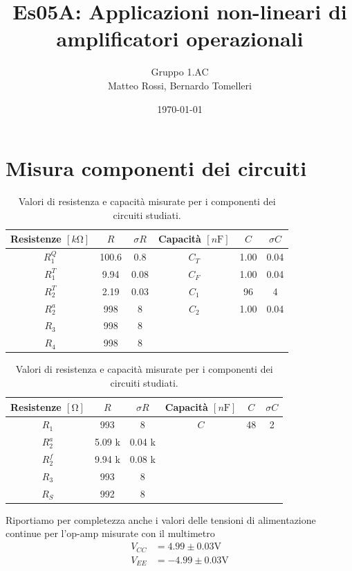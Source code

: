 \documentclass[10pt,a4paper]{article}
\author{Gruppo 1.AC \\ Matteo Rossi, Bernardo Tomelleri}
\title{Es05A: Applicazioni non-lineari di amplificatori operazionali}
\begin{document}
\date{\today}
\maketitle

\setcounter{section}{0}

\section*{Misura componenti dei circuiti}
\begin{table}[htbp]
\centering
\begin{tabular}{cccccc}
\toprule
Resistenze $[\si{k\ohm}]$ & $R$ & $\sigma R$ & Capacità $[\si{n\F}]$ & $C$ &
$\sigma C$ \\
\midrule
\midrule
$R_1^Q$	  & 100.6 	& 0.8 	 & $C_T$ & 1.00		 & 0.04 \\
$R_1^T$	  & 9.94	& 0.08 	 & $C_F$ & 1.00		 & 0.04 \\
$R_2^T$	  & 2.19	& 0.03	 & $C_1$ & 96		 & 4	\\
$R_2^a$	  & 998		& 8		 & $C_2$ & 1.00		 & 0.04 \\
$R_3$	  & 998		& 8		 & & & \\
$R_4$	  & 998		& 8		 & & & \\
\bottomrule     
\end{tabular}
\caption{Valori di resistenza e capacità misurate per i componenti dei
circuiti studiati. \label{tab: rcmes_B}}

\begin{tabular}{cccccc}
\toprule
Resistenze $[\si{\ohm}]$ & $R$ & $\sigma R$ & Capacità $[\si{n\F}]$ & $C$ &
$\sigma C$ \\
\midrule
\midrule
$R_1$	  & 993 	& 8 	 & $C$ & 48			 & 2 \\
$R_2^a$	  & 5.09 k	& 0.04 k 	 & & &	\\
$R_2^f$	  & 9.94 k		& 0.08 k & 		& 		 &	
\\
$R_3$	  & 993		& 8		 &				&	
			 &		\\
$R_S$	  & 992		& 8		 &				&	
			 &		\\
\bottomrule     
\end{tabular}
\caption{Valori di resistenza e capacità misurate per i componenti dei
circuiti studiati. \label{tab: rcmes_M}}
\end{table}

Riportiamo per completezza anche i valori delle tensioni di alimentazione
continue per l'op-amp misurate con il multimetro
\begin{align*}
V_{CC} &= 4.99 \pm 0.03 \si{\V} \\
V_{EE} &= -4.99 \pm 0.03 \si{\V}
\end{align*}
\end{document}
